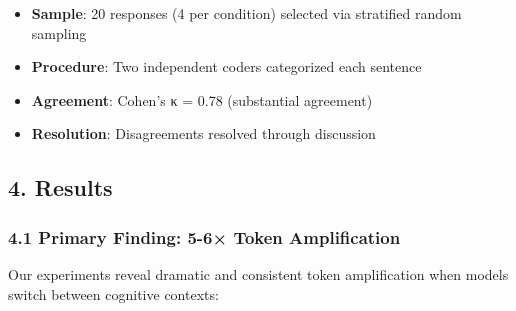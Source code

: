 \documentclass[
  11pt]{article}
\providecommand{\tightlist}{%
  \setlength{\itemsep}{0pt}\setlength{\parskip}{0pt}}
\begin{document}
\begin{itemize}
\tightlist
\item
  \textbf{Sample}: 20 responses (4 per condition) selected via
  stratified random sampling
\item
  \textbf{Procedure}: Two independent coders categorized each sentence
\item
  \textbf{Agreement}: Cohen's κ = 0.78 (substantial agreement)
\item
  \textbf{Resolution}: Disagreements resolved through discussion
\end{itemize}

\subsection{4. Results}\label{results}

\subsubsection{4.1 Primary Finding: 5-6× Token
Amplification}\label{primary-finding-5-6-token-amplification}

Our experiments reveal dramatic and consistent token amplification when
models switch between cognitive contexts:
\end{document}
